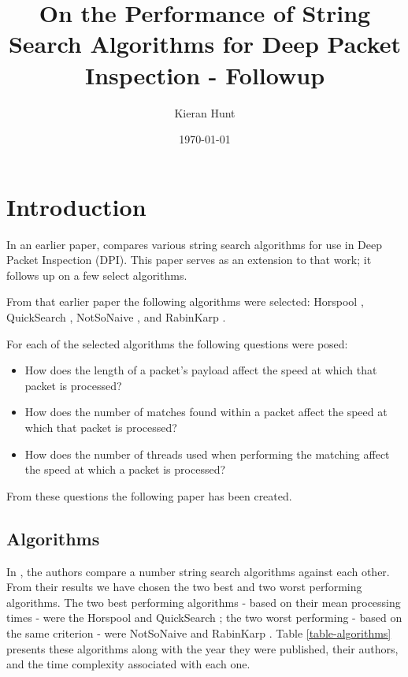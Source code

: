\documentclass[11pt]{article}
\begin{document}


\title{On the Performance of String Search Algorithms for Deep Packet Inspection - Followup}
\author{Kieran Hunt}
\date{\today}
\maketitle


\section{Introduction}

In an earlier paper, \citet{hunt2016} compares various string search algorithms for use in Deep Packet Inspection (DPI). This paper serves as an extension to that work; it follows up on a few select algorithms. 

From that earlier paper the following algorithms were selected: Horspool \citep{horspool1980}, QuickSearch \citep{sunday1990}, NotSoNaive \citep{hancart1993}, and RabinKarp \citep{karp1987}.

For each of the selected algorithms the following questions were posed:
\begin{itemize}
  \item How does the length of a packet's payload affect the speed at which that packet is processed?
  \item How does the number of matches found within a packet affect the speed at which that packet is processed?
  \item How does the number of threads used when performing the matching affect the speed at which a packet is processed?
\end{itemize}
 
 From these questions the following paper has been created.

\subsection{Algorithms}

In \citep{hunt2016}, the authors compare a number string search algorithms against each other. From their results we have chosen the two best and two worst performing algorithms. The two best performing algorithms - based on their mean processing times - were the Horspool \citep{horspool1980} and QuickSearch \citep{sunday1990}; the two worst performing - based on the same criterion - were NotSoNaive \citep{hancart1993} and RabinKarp \citep{karp1987}. Table \ref{table-algorithms} presents these algorithms along with the year they were published, their authors, and the time complexity associated with each one. 
\end{document}
